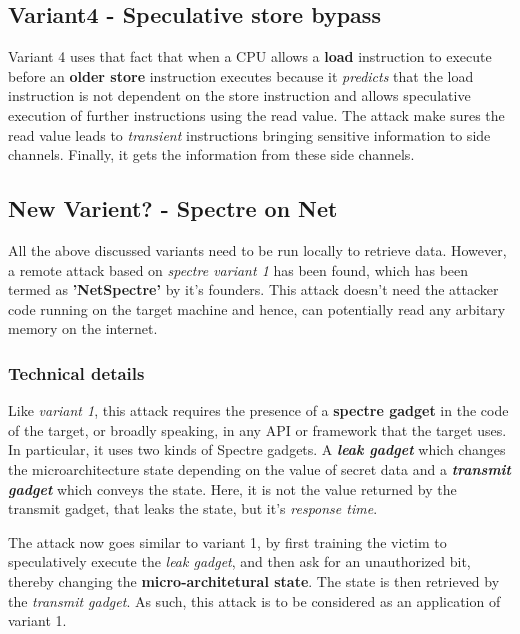 \documentclass[12pt]{article}
\begin{document}
\subsection{Variant4 - Speculative store bypass}

Variant 4 uses that fact that when a CPU allows a \textbf{load} instruction to execute before an \textbf{older store} instruction executes because it \textit{predicts} that the load instruction is not dependent on the store instruction and allows speculative execution of further instructions using the read value.
The attack make sures the read value leads to \textit{transient} instructions bringing sensitive information to side channels. Finally, it gets the information from these side channels.
\subsection{New Varient? - Spectre on Net}
All the above discussed variants need to be run locally to retrieve data. However, a remote attack based on \textit{spectre variant 1} has been found, which has been termed as \textbf{'NetSpectre'} by it's founders. This attack doesn't need the attacker code running on the target machine and hence, can potentially read any arbitary memory on the internet.  
\subsubsection{Technical details}
Like \textit{variant 1}, this attack requires the presence of a \textbf{spectre gadget} in the code of the target, or broadly speaking, in any API or framework that the target uses. In particular, it uses two kinds of Spectre gadgets. A \textbf{\textit{leak gadget}} which changes the microarchitecture state depending on the value of secret data and a \textbf{\textit{transmit gadget}} which conveys the state. Here, it is not the value returned by the transmit gadget, that leaks the state, but it's \textit{response time}.

The attack now goes similar to variant 1, by first training the victim to speculatively execute the \textit{leak gadget}, and then ask for an unauthorized bit, thereby changing the \textbf{micro-architetural state}. The state is then retrieved by the \textit{transmit gadget}. As such, this attack is to be considered as an application of variant 1. 
\end{document}
